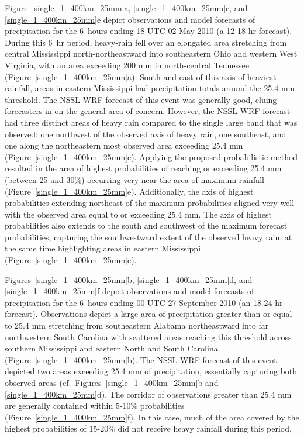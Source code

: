 \mbox{Figure \ref{single_1_400km_25mm}a}, \mbox{\ref{single_1_400km_25mm}c}, and \mbox{\ref{single_1_400km_25mm}e} depict observations and model forecasts of precipitation for the \mbox{6 hours} ending 18 UTC 02 May 2010 (a 12-18 hr forecast).
During this \mbox{6 hr} period, heavy-rain fell over an elongated area stretching from central Mississippi north-northeastward into southeastern Ohio and western West Virginia, with an area exceeding 200 mm in north-central Tennessee \mbox{(Figure \ref{single_1_400km_25mm}a)}.
South and east of this axis of heaviest rainfall, areas in eastern Mississippi had precipitation totals around the 25.4 mm threshold.
The NSSL-WRF forecast of this event was generally good, cluing forecasters in on the general area of concern.
However, the NSSL-WRF forecast had three distinct areas of heavy rain compared to the single large band that was observed: one northwest of the observed axis of heavy rain, one southeast, and one along the northeastern most observed area exceeding 25.4 mm \mbox{(Figure \ref{single_1_400km_25mm}c)}.
Applying the proposed probabilistic method resulted in the area of highest probabilities of reaching or exceeding 25.4 mm (between 25 and 30\%) occurring very near the area of maximum rainfall \mbox{(Figure \ref{single_1_400km_25mm}e)}.
Additionally, the axis of highest probabilities extending northeast of the maximum probabilities aligned very well with the observed area equal to or exceeding 25.4 mm.
The axis of highest probabilities also extends to the south and southwest of the maximum forecast probabilities, capturing the southwestward extent of the observed heavy rain, at the same time highlighting areas in eastern Mississippi \mbox{(Figure \ref{single_1_400km_25mm}e)}.


\mbox{Figures \ref{single_1_400km_25mm}b}, \mbox{\ref{single_1_400km_25mm}d}, and \mbox{\ref{single_1_400km_25mm}f} depict observations and model forecasts of precipitation for the \mbox{6 hours} ending 00 UTC 27 September 2010 (an 18-24 hr forecast).
Observations depict a large area of precipitation greater than or equal to 25.4 mm stretching from southeastern Alabama northeastward into far northwestern South Carolina with scattered areas reaching this threshold across southern Mississippi and eastern North and South Carolina \mbox{(Figure \ref{single_1_400km_25mm}b)}.
The NSSL-WRF forecast of this event depicted two areas exceeding 25.4 mm of precipitation, essentially capturing both observed areas (\mbox{cf. Figures \ref{single_1_400km_25mm}b} and \mbox{\ref{single_1_400km_25mm}d)}.
The corridor of observations greater than 25.4 mm are generally contained within 5-10\% probabilities \mbox{(Figure \ref{single_1_400km_25mm}f)}. In this case, much of the area covered by the highest probabilities of 15-20\% did not receive heavy rainfall during this period.


